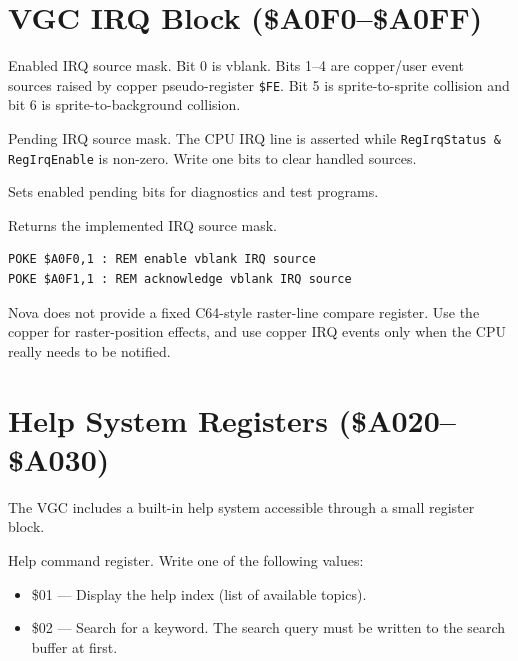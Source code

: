 \section{VGC IRQ Block (\$A0F0--\$A0FF)}
\label{sec:vgc-irq}


Enabled IRQ source mask.  Bit 0 is vblank.  Bits 1--4 are copper/user event
sources raised by copper pseudo-register \texttt{\$FE}.  Bit 5 is
sprite-to-sprite collision and bit 6 is sprite-to-background collision.


Pending IRQ source mask.  The CPU IRQ line is asserted while
\texttt{RegIrqStatus \& RegIrqEnable} is non-zero.  Write one bits to clear
handled sources.


Sets enabled pending bits for diagnostics and test programs.


Returns the implemented IRQ source mask.

\begin{lstlisting}
POKE $A0F0,1 : REM enable vblank IRQ source
POKE $A0F1,1 : REM acknowledge vblank IRQ source
\end{lstlisting}

\begin{tipbox}
Nova does not provide a fixed C64-style raster-line compare register.  Use
the copper for raster-position effects, and use copper IRQ events only when
the CPU really needs to be notified.
\end{tipbox}


\section{Help System Registers (\$A020--\$A030)}
\label{sec:vgc-help}

The VGC includes a built-in help system accessible through a small register
block.


Help command register.  Write one of the following values:
\begin{itemize}
  \item \$01 --- Display the help index (list of available topics).
  \item \$02 --- Search for a keyword.  The search query must be written to
        the search buffer at  first.
\end{itemize}

